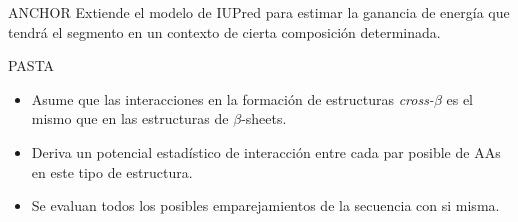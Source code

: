 \documentclass{beamer}
\begin{document}
\begin{frame}

\begin{block}{ANCHOR}
 Extiende el modelo de IUPred para estimar la ganancia de energía que tendrá el segmento en un contexto de cierta composición determinada.
\end{block}

\pause
\begin{block}{PASTA}
\begin{itemize}
 \item Asume que las interacciones en la formación de estructuras \textit{cross-$\beta$} es el mismo que en las estructuras de $\beta$-sheets.
 \item Deriva un potencial estadístico de interacción entre cada par posible de AAs en este tipo de estructura.
 \item Se evaluan todos los posibles emparejamientos de la secuencia con si misma.
\end{itemize}
\end{block}

% 
\end{frame}






















\end{document}

